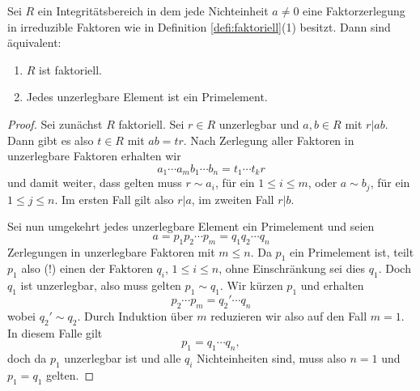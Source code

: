 \documentclass{book}
\begin{document}
\begin{prop}
    \label{prop:faktor}
    Sei $R$ ein Integritätsbereich in dem jede Nichteinheit $a \ne 0$ eine
    Faktorzerlegung in irreduzible Faktoren wie in Definition
    \ref{defi:faktoriell}(1) besitzt. Dann sind äquivalent:
    \begin{enumerate}[label=(\roman *)]
        \item $R$ ist faktoriell.
        \item Jedes unzerlegbare Element ist ein Primelement.
    \end{enumerate}
\end{prop}
\begin{proof}
    Sei zunächst $R$ faktoriell. Sei $r \in R$ unzerlegbar und $a,b \in R$ mit
    $r | ab$. Dann gibt es also $t \in R$ mit $ab = t r$. Nach Zerlegung aller
    Faktoren in unzerlegbare Faktoren erhalten wir
    \[
        a_1 \cdots a_m b_1 \cdots b_n = t_1 \cdots t_k r
    \]
    und damit weiter, dass gelten muss $r \sim a_i$, für ein $1 \le i \le m$,
    oder $a \sim b_j$, für ein $1 \le j \le n$. Im ersten Fall gilt also $r | a$, im zweiten Fall $r | b$. 

    Sei nun umgekehrt jedes unzerlegbare Element ein Primelement und seien
    \[
        a = p_1 p_2 \cdots p_m = q_1 q_2 \cdots q_n
    \]
    Zerlegungen in unzerlegbare Faktoren mit $m \le n$. Da $p_1$ ein Primelement ist, teilt
    $p_1$ also (!) einen der Faktoren $q_i$, $1 \le i \le n$, ohne Einschränkung
    sei dies $q_1$. Doch $q_1$ ist unzerlegbar, also muss gelten $p_1 \sim q_1$. Wir kürzen $p_1$ und erhalten
    \[
        p_2 \cdots p_m = q_2' \cdots q_n
    \]
    wobei $q_2' \sim q_2$. Durch Induktion über $m$ reduzieren wir also auf den
    Fall $m=1$. In diesem Falle gilt 
    \[
        p_1 = q_1 \cdots q_n,
    \]
    doch da $p_1$ unzerlegbar ist und alle $q_i$ Nichteinheiten sind, muss also
    $n = 1$ und $p_1 = q_1$ gelten.
\end{proof}
\end{document}
